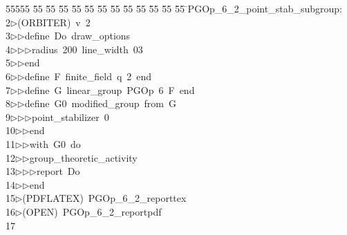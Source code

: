 %
%
\begin{tabbing}
55555 \= 55 \= 55 \= 55 \= 55 \= 55 \= 55 \= 55 \= 55 \= 55 \= 55 \= 55 \= 55 \= \>PGOp\_6\_2\_point\_stab\_subgroup:\\[0pt]
2\>$\triangleright$\>(ORBITER)\ v\ 2\ \\[0pt]
3\>$\triangleright$\>$\triangleright$\>define\ Do\ draw\_options\ \\[0pt]
4\>$\triangleright$\>$\triangleright$\>$\triangleright$\>radius\ 200\ line\_width\ 03\ \\[0pt]
5\>$\triangleright$\>$\triangleright$\>end\ \\[0pt]
6\>$\triangleright$\>$\triangleright$\>define\ F\ finite\_field\ q\ 2\ end\ \\[0pt]
7\>$\triangleright$\>$\triangleright$\>define\ G\ linear\_group\ PGOp\ 6\ F\ end\ \\[0pt]
8\>$\triangleright$\>$\triangleright$\>define\ G0\ modified\_group\ from\ G\ \\[0pt]
9\>$\triangleright$\>$\triangleright$\>$\triangleright$\>point\_stabilizer\ 0\ \\[0pt]
10\>$\triangleright$\>$\triangleright$\>end\ \\[0pt]
11\>$\triangleright$\>$\triangleright$\>with\ G0\ do\ \\[0pt]
12\>$\triangleright$\>$\triangleright$\>group\_theoretic\_activity\ \\[0pt]
13\>$\triangleright$\>$\triangleright$\>$\triangleright$\>report\ Do\ \\[0pt]
14\>$\triangleright$\>$\triangleright$\>end\\[0pt]
15\>$\triangleright$\>(PDFLATEX)\ PGOp\_6\_2\_reporttex\\[0pt]
16\>$\triangleright$\>(OPEN)\ PGOp\_6\_2\_reportpdf\\[0pt]
17\>\end{tabbing}

